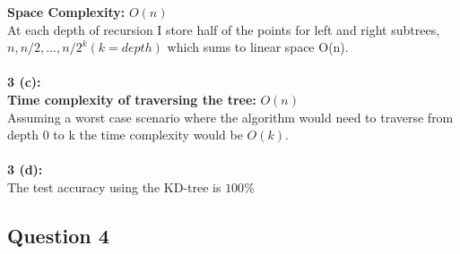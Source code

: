 \documentclass[12pt]{article}
\begin{document}
\textbf{Space Complexity:} $O(n)$
\\ At each depth of recursion I store half of the points for left and right subtrees, $n, n/2, ..., n/2^k (k = depth)$ which sums to linear space O(n).
\\\\
\textbf{3 (c):}\\
\textbf{Time complexity of traversing the tree:} $O(n)$\\
Assuming a worst case scenario where the algorithm would need to traverse from depth 0 to k the time complexity would be $O(k)$.
\\\\\textbf{3 (d):}\\
The test accuracy using the KD-tree is $100\%$
\label{sec:stone}

\subsection*{Question 4}
\end{document}
